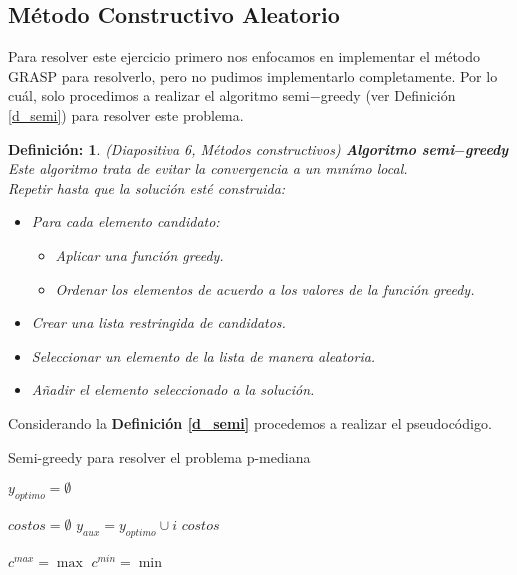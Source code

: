 \documentclass[11pt,letterpaper]{article}
\newtheorem{thmd}{Definición:}
\begin{document}
\subsection*{Método Constructivo Aleatorio}
Para resolver este ejercicio primero nos enfocamos en implementar el método GRASP para resolverlo, pero no pudimos implementarlo completamente. Por lo cuál, solo procedimos a realizar el algoritmo semi$-$greedy (ver Definición \ref{d_semi}) para resolver este problema.

\begin{framed}\label{d_semi}
    \begin{thmd} 
    (Diapositiva 6, Métodos constructivos) \textbf{Algoritmo semi$-$greedy} Este algoritmo trata de evitar la convergencia a un mınímo local.\\
    
Repetir hasta que la solución esté construida:

\begin{itemize}
\item Para cada elemento candidato:
\begin{itemize}
\item Aplicar una función greedy.
\item Ordenar los elementos de acuerdo a los valores de la función greedy.
\end{itemize}
\item Crear una lista restringida de candidatos.
\item Seleccionar un elemento de la lista de manera aleatoria.
\item Añadir el elemento seleccionado a la solución.
\end{itemize}
    \end{thmd}
\end{framed}
Considerando la \textbf{Definición \ref{d_semi}} procedemos a realizar el pseudocódigo. 
\begin{algorithm}
  \caption{Semi-greedy para resolver el problema p-mediana}
  \begin{algorithmic}[1]
 

    \State $y_{optimo} = \emptyset$
 
    \State $costos = \emptyset$
      \State $y_{aux} = y_{optimo} \cup i $
      \State $costos_{}$
      \EndFor
      
      \State $c^{max} = \max$
      \State $c^{min} = \min$ 
    \EndWhile
 
    
  \end{algorithmic}
\end{algorithm}
\end{document}
